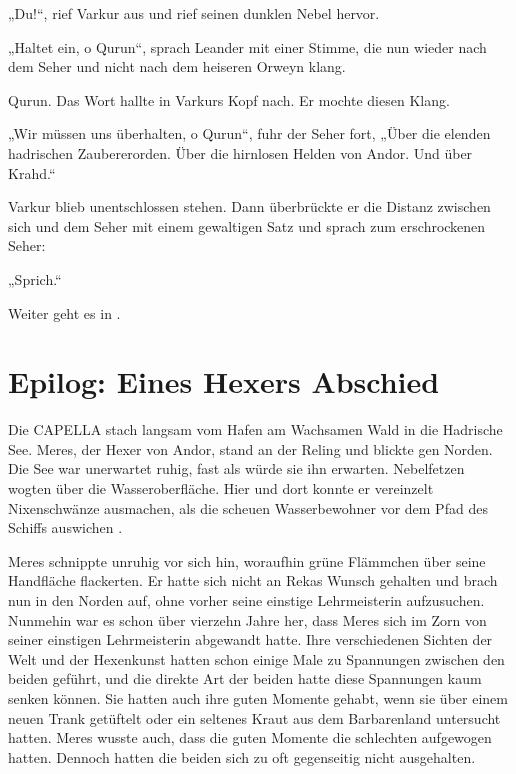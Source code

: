 „Du!“, rief Varkur aus und rief seinen dunklen Nebel hervor.

„Haltet ein, o Qurun“, sprach Leander mit einer Stimme, die nun wieder nach dem Seher und nicht nach dem heiseren Orweyn klang.

Qurun. Das Wort hallte in Varkurs Kopf nach. Er mochte diesen Klang.

„Wir müssen uns überhalten, o Qurun“, fuhr der Seher fort, „Über die elenden hadrischen Zaubererorden. Über die hirnlosen Helden von Andor. Und über Krahd.“

Varkur blieb unentschlossen stehen. Dann überbrückte er die Distanz zwischen sich und dem Seher mit einem gewaltigen Satz und sprach zum erschrockenen Seher:

„Sprich.“

\begin{commentbox}
    Weiter geht es in .
\end{commentbox}












\newpage
\section{Epilog: Eines Hexers Abschied}



Die CAPELLA stach langsam vom Hafen am Wachsamen Wald in die Hadrische See. Meres, der Hexer von Andor, stand an der Reling und blickte gen Norden. Die See war unerwartet ruhig, fast als würde sie ihn erwarten. Nebelfetzen wogten über die Wasseroberfläche. Hier und dort konnte er vereinzelt Nixenschwänze ausmachen, als die scheuen Wasserbewohner vor dem Pfad des Schiffs auswichen .

Meres schnippte unruhig vor sich hin, woraufhin grüne Flämmchen über seine Handfläche flackerten. Er hatte sich nicht an Rekas Wunsch gehalten und brach nun in den Norden auf, ohne vorher seine einstige Lehrmeisterin aufzusuchen. Nunmehin war es schon über vierzehn Jahre her, dass Meres sich im Zorn von seiner einstigen Lehrmeisterin abgewandt hatte. Ihre verschiedenen Sichten der Welt und der Hexenkunst hatten schon einige Male zu Spannungen zwischen den beiden geführt, und die direkte Art der beiden hatte diese Spannungen kaum senken können. Sie hatten auch ihre guten Momente gehabt, wenn sie über einem neuen Trank getüftelt oder ein seltenes Kraut aus dem Barbarenland untersucht hatten. Meres wusste auch, dass die guten Momente die schlechten aufgewogen hatten. Dennoch hatten die beiden sich zu oft gegenseitig nicht ausgehalten.

